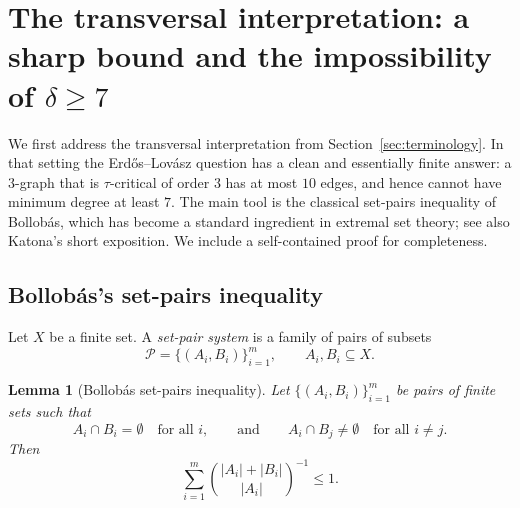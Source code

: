 \documentclass[11pt]{amsart}
\newtheorem{lemma}[theorem]{Lemma}
\theoremstyle{definition}
\theoremstyle{remark}
\newcommand{\cP}{\mathcal{P}}
\newcommand{\del}{\delta}
\begin{document}
\section{The transversal interpretation: a sharp bound and the impossibility of \texorpdfstring{$\del\ge 7$}{delta>=7}}\label{sec:tau}

We first address the transversal interpretation from Section~\ref{sec:terminology}.
In that setting the Erd\H{o}s--Lov\'asz question has a clean and essentially finite answer: a $3$-graph that is $\tau$-critical of order $3$ has at most $10$ edges, and hence cannot have minimum degree at least $7$.
The main tool is the classical set-pairs inequality of Bollob\'as,\cite{Bollobas1965} which has become a standard ingredient in extremal set theory; see also Katona's short exposition.\cite{Katona1974}
We include a self-contained proof for completeness.

\subsection{Bollob\'as's set-pairs inequality}

Let $X$ be a finite set.
A \emph{set-pair system} is a family of pairs of subsets
\[
\cP=\{(A_i,B_i)\}_{i=1}^m,\qquad A_i,B_i\subseteq X.
\]

\begin{lemma}[Bollob\'as set-pairs inequality]\label{lem:bollobas}
Let $\{(A_i,B_i)\}_{i=1}^m$ be pairs of finite sets such that
\begin{equation}\label{eq:bollobas-hyp}
A_i\cap B_i=\emptyset\quad\text{for all }i,\qquad\text{and}\qquad
A_i\cap B_j\neq\emptyset\quad\text{for all }i\neq j.
\end{equation}
Then
\begin{equation}\label{eq:bollobas}
\sum_{i=1}^m \binom{|A_i|+|B_i|}{|A_i|}^{-1}\le 1.
\end{equation}
\end{lemma}
\end{document}
